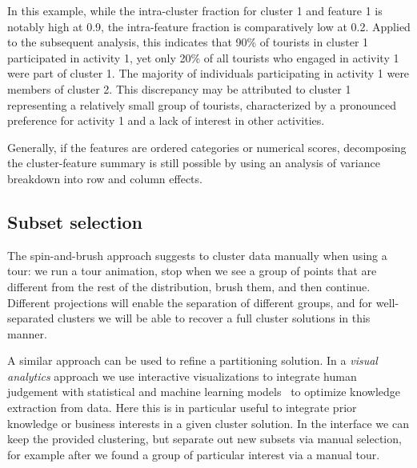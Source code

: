 \documentclass[article]{ajs}
\begin{document}
In this example, while the intra-cluster fraction for cluster 1 and feature 1 is notably high at 0.9, the intra-feature fraction is comparatively low at 0.2. Applied to the subsequent analysis, this indicates that 90\% of tourists in cluster 1 participated in activity 1, yet only 20\% of all tourists who engaged in activity 1 were part of cluster 1. The majority of individuals participating in activity 1 were members of cluster 2. This discrepancy may be attributed to cluster 1 representing a relatively small group of tourists, characterized by a pronounced preference for activity 1 and a lack of interest in other activities.

Generally, if the features are ordered categories or numerical scores, decomposing the cluster-feature summary is still possible by using an analysis of variance breakdown into row and column effects.





\subsection{Subset selection}

The spin-and-brush approach suggests to cluster data manually when using a tour: we run a tour animation, stop when we see a group of points that are different from the rest of the distribution, brush them, and then continue. Different projections will enable the separation of different groups, and for well-separated clusters we will be able to recover a full cluster solutions in this manner.

A similar approach can be used to refine a partitioning solution. In a \textit{visual analytics} approach we use interactive visualizations to integrate human judgement with statistical and machine learning models~\citep{keim2010mastering} to optimize knowledge extraction from data.
Here this is in particular useful to integrate prior knowledge or business interests in a given cluster solution. In the interface we can keep the provided clustering, but separate out new subsets via manual selection, for example after we found a group of particular interest via a manual tour.
\end{document}
